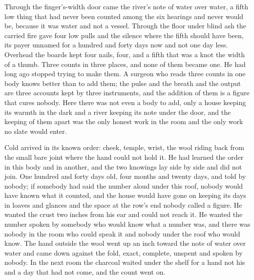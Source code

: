 Through the finger's-width door came the river's note of water over water, a fifth low thing that had never been counted among the six hearings and never would be, because it was water and not a vessel. Through the floor under blind ash the carried fire gave four low pulls and the silence where the fifth should have been, its payer unnamed for a hundred and forty days now and not one day less. Overhead the boards kept four nails, four, and a fifth that was a knot the width of a thumb. Three counts in three places, and none of them became one. He had long ago stopped trying to make them. A surgeon who reads three counts in one body knows better than to add them; the pulse and the breath and the output are three accounts kept by three instruments, and the addition of them is a figure that cures nobody. Here there was not even a body to add, only a house keeping its warmth in the dark and a river keeping its note under the door, and the keeping of them apart was the only honest work in the room and the only work no slate would enter.

Cold arrived in its known order: cheek, temple, wrist, the wool riding back from the small bare joint where the hand could not hold it. He had learned the order in this body and in another, and the two knowings lay side by side and did not join. One hundred and forty days old, four months and twenty days, and told by nobody; if somebody had said the number aloud under this roof, nobody would have known what it counted, and the house would have gone on keeping its days in loaves and glances and the space at the row's end nobody called a figure. He wanted the crust two inches from his ear and could not reach it. He wanted the number spoken by somebody who would know what a number was, and there was nobody in the room who could speak it and nobody under the roof who would know. The hand outside the wool went up an inch toward the note of water over water and came down against the fold, exact, complete, unspent and spoken by nobody. In the next room the charcoal waited under the shelf for a hand not his and a day that had not come, and the count went on.

